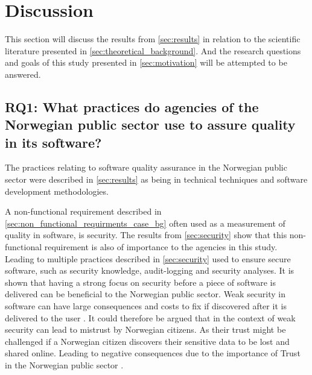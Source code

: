 \chapter{Discussion} \label{sec:discussion}
This section will discuss the results from \autoref{sec:results} in relation to the scientific literature presented in \autoref{sec:theoretical_background}. And the research questions and goals of this study presented in \autoref{sec:motivation} will be attempted to be answered.

\section{RQ1: What practices do agencies of the Norwegian public sector use to assure quality in its software?}
The practices relating to software quality assurance in the Norwegian public sector were described in \autoref{sec:results} as being in technical techniques and software development methodologies.

A non-functional requirement described in \autoref{sec:non_functional_requirments_case_bg} often used as a measurement of quality in software, is security. The results from \autoref{sec:security} show that this non-functional requirement is also of importance to the agencies in this study. Leading to multiple practices described in \autoref{sec:security} used to ensure secure software, such as security knowledge, audit-logging and security analyses. It is shown that having a strong focus on security before a piece of software is delivered can be beneficial to the Norwegian public sector. Weak security in software can have large consequences and costs to fix if discovered after it is delivered to the user \cite{csw_2011}. It could therefore be argued that in the context of weak security can lead to mistrust by Norwegian citizens. As their trust might be challenged if a Norwegian citizen discovers their sensitive data to be lost and shared online. Leading to negative consequences due to the importance of Trust in the Norwegian public sector \cite{oecd_2022}.


